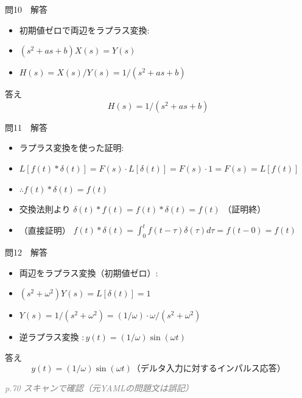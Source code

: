 \documentclass[aspectratio=43,professionalfonts,handout]{beamer}
\begin{document}
\begin{frame}{問10　解答}
  \begin{block}{}
  \begin{itemize}\setlength{\itemsep}{2pt}
    \item 初期値ゼロで両辺をラプラス変換:
    \item $(s^{2}+as+b)X(s) = Y(s)$
    \item $H(s) = X(s)/Y(s) = 1/(s^{2}+as+b)$
  \end{itemize}
  \end{block}
  \begin{exampleblock}{答え}
    \[
    H(s) = 1/(s^{2}+as+b)
  \]
  \end{exampleblock}
\end{frame}

\begin{frame}{問11　解答}
  \begin{block}{}
  \begin{itemize}\setlength{\itemsep}{2pt}
    \item ラプラス変換を使った証明:
    \item $L[f(t)*\delta(t)] = F(s)\cdot L[\delta(t)] = F(s)\cdot1 = F(s) = L[f(t)]$
    \item $\therefore f(t)*\delta(t) = f(t)$
    \item 交換法則より $\delta(t)*f(t) = f(t)*\delta(t) = f(t)$ （証明終）
    \item （直接証明） $f(t)*\delta(t) = \int_{0}^t f(t-\tau)\delta(\tau)d\tau = f(t-0) = f(t)$
  \end{itemize}
  \end{block}
\end{frame}

\begin{frame}{問12　解答}
  \begin{block}{}
  \begin{itemize}\setlength{\itemsep}{2pt}
    \item 両辺をラプラス変換（初期値ゼロ）:
    \item $(s^{2} + \omega^{2})Y(s) = L[\delta(t)] = 1$
    \item $Y(s) = 1/(s^{2}+\omega^{2}) = (1/\omega)\cdot\omega/(s^{2}+\omega^{2})$
    \item 逆ラプラス変換 $: y(t) = (1/\omega)\sin(\omega t)$
  \end{itemize}
  \end{block}
  \begin{exampleblock}{答え}
    \[
    y(t) = (1/\omega)\sin(\omega t)  （デルタ入力に対するインパルス応答）
  \]
  \end{exampleblock}
  {\footnotesize \textcolor{gray}{\textit{p.70 スキャンで確認（元YAMLの問題文は誤記）}}}
\end{frame}
\end{document}
